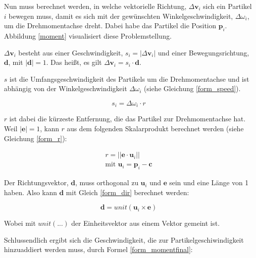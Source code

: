 Nun muss berechnet werden, in welche vektorielle Richtung, $\Delta \textbf{v}_i$ sich ein Partikel $i$ bewegen muss, damit es sich mit der gewünschten Winkelgeschwindigkeit, $\Delta \omega_i$, um die Drehmomentachse dreht. Dabei habe das Partikel die Position $\textbf{p}_i$. Abbildung \ref{moment} visualisiert diese Problemstellung.



$\Delta \textbf{v}_i$ besteht aus einer Geschwindigkeit, $s_i=|\Delta \textbf{v}_i|$ und einer Bewegungsrichtung, $\textbf{d}$, mit $|\textbf{d}|=1$. Das heißt, es gilt $\Delta \textbf{v}_i = s_i \cdot \textbf{d}$.

$s$ ist die Umfangsgeschwindigkeit des Partikels um die Drehmomentachse und ist abhängig von der Winkelgeschwindigkeit $\Delta \omega_i$ (siehe Gleichung \ref{form_speed}).

\begin{equation}
s_i = \Delta \omega_i \cdot r
\label{form_speed}
\end{equation}

$r$ ist dabei die kürzeste Entfernung, die das Partikel zur Drehmomentachse hat.
Weil $|\textbf{e}|=1$, kann $r$ aus dem folgenden Skalarprodukt berechnet werden (siehe Gleichung \ref{form_r}):

\begin{equation}
\begin{split}
r = ||\textbf{e} \cdot \textbf{u}_i|| \\
\text{mit } \textbf{u}_i=\textbf{p}_i-\textbf{c}
\end{split}
\label{form_r}
\end{equation}

Der Richtungsvektor, $\textbf{d}$, muss orthogonal zu $\textbf{u}_i$ und $\textbf{e}$ sein und eine Länge von 1 haben. Also kann $\textbf{d}$ mit Gleich \ref{form_dir} berechnet werden:

\begin{equation}
\textbf{d} = unit(\textbf{u}_i \times \textbf{e} )
\label{form_dir}
\end{equation}

Wobei mit $unit(...)$ der Einheitsvektor aus einem Vektor gemeint ist.

Schlussendlich ergibt sich die Geschwindigkeit, die zur Partikelgeschiwindigkeit hinzuaddiert werden muss, durch Formel    \ref{form_momentfinal}:

